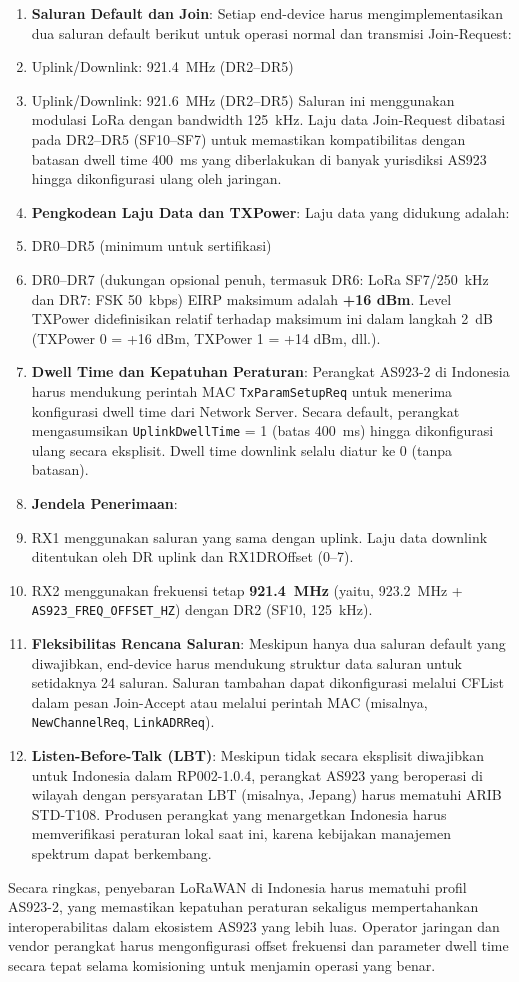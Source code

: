 \begin{enumerate}
    \item \textbf{Saluran Default dan Join}:
          Setiap end-device harus mengimplementasikan dua saluran default berikut untuk operasi normal dan transmisi Join-Request:
    \item Uplink/Downlink: 921.4~MHz (DR2–DR5)
    \item Uplink/Downlink: 921.6~MHz (DR2–DR5)
          Saluran ini menggunakan modulasi LoRa dengan bandwidth 125~kHz. Laju data Join-Request dibatasi pada DR2–DR5 (SF10–SF7) untuk memastikan kompatibilitas dengan batasan dwell time 400~ms yang diberlakukan di banyak yurisdiksi AS923 hingga dikonfigurasi ulang oleh jaringan.
    \item \textbf{Pengkodean Laju Data dan TXPower}:
          Laju data yang didukung adalah:
    \item DR0–DR5 (minimum untuk sertifikasi)
    \item DR0–DR7 (dukungan opsional penuh, termasuk DR6: LoRa SF7/250~kHz dan DR7: FSK 50~kbps)
          EIRP maksimum adalah \textbf{+16 dBm}. Level TXPower didefinisikan relatif terhadap maksimum ini dalam langkah 2~dB (TXPower 0 = +16 dBm, TXPower 1 = +14 dBm, dll.).
    \item \textbf{Dwell Time dan Kepatuhan Peraturan}:
          Perangkat AS923-2 di Indonesia harus mendukung perintah MAC \texttt{TxParamSetupReq} untuk menerima konfigurasi dwell time dari Network Server. Secara default, perangkat mengasumsikan \texttt{UplinkDwellTime} = 1 (batas 400~ms) hingga dikonfigurasi ulang secara eksplisit. Dwell time downlink selalu diatur ke 0 (tanpa batasan).
    \item \textbf{Jendela Penerimaan}:
    \item RX1 menggunakan saluran yang sama dengan uplink. Laju data downlink ditentukan oleh DR uplink dan RX1DROffset (0–7).
    \item RX2 menggunakan frekuensi tetap \textbf{921.4~MHz} (yaitu, 923.2~MHz + \texttt{AS923\_FREQ\_OFFSET\_HZ}) dengan DR2 (SF10, 125~kHz).
    \item \textbf{Fleksibilitas Rencana Saluran}:
          Meskipun hanya dua saluran default yang diwajibkan, end-device harus mendukung struktur data saluran untuk setidaknya 24 saluran. Saluran tambahan dapat dikonfigurasi melalui CFList dalam pesan Join-Accept atau melalui perintah MAC (misalnya, \texttt{NewChannelReq}, \texttt{LinkADRReq}).
    \item \textbf{Listen-Before-Talk (LBT)}:
          Meskipun tidak secara eksplisit diwajibkan untuk Indonesia dalam RP002-1.0.4, perangkat AS923 yang beroperasi di wilayah dengan persyaratan LBT (misalnya, Jepang) harus mematuhi ARIB STD-T108. Produsen perangkat yang menargetkan Indonesia harus memverifikasi peraturan lokal saat ini, karena kebijakan manajemen spektrum dapat berkembang.
\end{enumerate}
Secara ringkas, penyebaran LoRaWAN di Indonesia harus mematuhi profil AS923-2, yang memastikan kepatuhan peraturan sekaligus mempertahankan interoperabilitas dalam ekosistem AS923 yang lebih luas. Operator jaringan dan vendor perangkat harus mengonfigurasi offset frekuensi dan parameter dwell time secara tepat selama komisioning untuk menjamin operasi yang benar.

